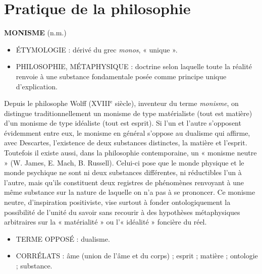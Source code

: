 
\section{Pratique de la philosophie}
{\bf M{\footnotesize ONISME}} (n.m.)

\begin{itemize}[leftmargin=1cm, label=, itemsep=1pt]
\item {\footnotesize ÉTYMOLOGIE} : dérivé du grec {\it monos}, « unique ».
\item {\footnotesize PHILOSOPHIE, MÉTAPHYSIQUE} : doctrine selon
laquelle toute la réalité renvoie à
une substance fondamentale posée
comme principe unique d’explication.
\end{itemize}
 
Depuis le philosophe Wolff
({\footnotesize XVIII}$^\text{e}$ siècle), inventeur du terme
{\it monisme}, on distingue traditionnellement un monisme de type matérialiste
(tout est matière) d'un monisme de type
idéaliste (tout est esprit). Si l'un et
l'autre s'opposent évidemment entre
eux, le monisme en général s'oppose au
dualisme qui affirme, avec Descartes,
l'existence de deux substances distinctes, la matière et l'esprit. Toutefois il
existe aussi, dans la philosophie
contemporaine, un « monisme neutre »
(W. James, E. Mach, B. Russell). Celui-ci pose que le monde physique et le
monde psychique ne sont ni deux substances différentes, ni réductibles l'un à
l'autre, mais qu'ils constituent deux
registres de phénomènes renvoyant à
une même substance sur la nature de
laquelle on n’a pas à se prononcer. Ce
monisme neutre, d'inspiration positiviste, vise surtout à fonder
ontologiquement la possibilité de l'unité
du savoir sans recourir à des hypothèses
métaphysiques arbitraires sur la « matérialité » ou l’« idéalité » foncière du réel.

\begin{itemize}[leftmargin=1cm, label=, itemsep=1pt]
\item {\footnotesize TERME OPPOSÉ} : dualisme.
\item {\footnotesize CORRÉLATS} : âme (union de l'âme et du
corps) ; esprit ; matière ; ontologie ;
substance.
\end{itemize}

